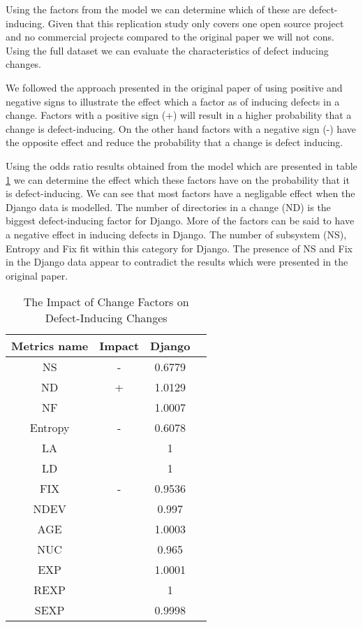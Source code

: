 \documentclass[10pt, conference]{IEEEtran}
\begin{document}
Using the factors from the model we can determine which of these are defect-inducing. Given that this replication study only covers one open source project and no commercial projects compared to the original paper we will not cons. Using the full dataset we can evaluate the characteristics of defect inducing changes.

We followed the approach presented in the original paper of using positive and negative signs to illustrate the effect which a factor as of inducing defects in a change. Factors with a positive sign (+) will result in a higher probability that a change is defect-inducing. On the other hand factors with a negative sign (-) have the opposite effect and reduce the probability that a change is defect inducing.  

Using the odds ratio results obtained from the model which are presented in table \ref{table:odds_ratio} we can determine the effect which these factors have on the probability that it is defect-inducing.  We can see that most factors have a negligable effect when the Django data is modelled. The number of directories in a change (ND) is the biggest defect-inducing factor for Django. More of the factors can be said to have a negative effect in inducing defects in Django. The number of subsystem (NS), Entropy and Fix fit within this category for Django. The presence of NS and Fix in the Django data appear to contradict the results which were presented in the original paper.

\begin{table}
	\centering
	\caption{The Impact of Change Factors on Defect-Inducing Changes}
	\begin{tabular}{|c|c|c|c|}
		\hline Metrics name & Impact & Django \\ 
		\hline NS & - & 0.6779 \\ 
		\hline ND & + & 1.0129 \\ 
		\hline NF &  & 1.0007 \\ 
		\hline Entropy & - & 0.6078 \\ 
		\hline LA &  & 1 \\ 
		\hline LD &  & 1 \\ 
		\hline FIX & - & 0.9536 \\ 
		\hline NDEV &  & 0.997 \\ 
		\hline AGE &  & 1.0003 \\ 
		\hline NUC &  & 0.965 \\ 
		\hline EXP &  & 1.0001 \\ 
		\hline REXP &  & 1 \\ 
		\hline SEXP &  & 0.9998 \\ 
		\hline 
	\end{tabular}
	\label{table:odds_ratio}  
\end{table}
\end{document}

